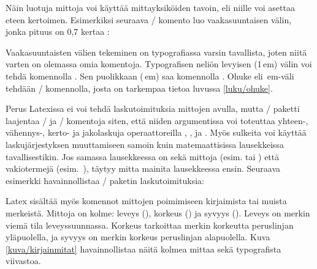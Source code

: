\begin{koodilohkosis}
\newlength{\omamitta}         %
\setlength{\omamitta}{2.3em}  %
\addtolength{\omamitta}{1em}  %
\addtolength{\omamitta}{-1em} %
\end{koodilohkosis}

\noindent
Näin luotuja mittoja voi käyttää mittayksiköiden tavoin, eli niille voi
asettaa eteen kertoimen. Esimerkiksi seuraava \-/
komento luo vaakasuuntaisen välin, jonka pituus on 0,7 kertaa
:

\begin{koodilohkosis}
\hspace{0.7\omamitta}
\end{koodilohkosis}

\noindent
Vaakasuuntaisten välien tekeminen on typografiassa varsin tavallista,
joten niitä varten on olemassa omia komentoja. Typografisen neliön
levyisen (1\,em) välin voi tehdä komennolla . Sen
puolikkaan (\,em) saa komennolla .
Ohuke eli \,em-väli tehdään \komentom{,}\-/ komennolla,
josta on tarkempaa tietoa luvussa \ref{luku/ohuke}.

Perus Latexissa ei voi tehdä laskutoimituksia mittojen avulla, mutta
\-/ paketti laajentaa \-/{} ja
\-/ komentoja siten, että niiden argumentissa voi
toteuttaa yhteen-, vähennys-, kerto- ja jako\-las\-kuja operaattoreilla
\koodi{+}, \koodi{-}, \koodi{*} ja \koodi{/}. Myös sulkeita voi käyttää
laskujärjestyksen muuttamiseen samoin kuin matemaattisissa lausekkeissa
tavallisestikin. Jos samassa lausekkeessa on sekä mittoja (esim.
 tai \koodi{1em}) että vakiotermejä (esim.~),
täytyy mitta mainita lausekkeessa ensin. Seuraava esimerkki
havainnollistaa \-/ paketin laskutoimituksia:

\begin{koodilohkosis}
\setlength{\omamitta}{\parindent + 1em}
\setlength{\omamitta}{\parindent * 2}  %
\end{koodilohkosis}

\noindent
Latex sisältää myös komennot mittojen poimimiseen kirjaimista tai muista
merkeistä. Mittoja on kolme: leveys (), korkeus
() ja syvyys (). Leveys on merkin
viemä tila leveyssuunnassa. Korkeus tarkoittaa merkin korkeutta
peruslinjan yläpuolella, ja syvyys on merkin korkeus peruslinjan
alapuolella. Kuva \ref{kuva/kirjainmitat} havainnollistaa näitä kolmea
mittaa sekä typografista viivastoa.

